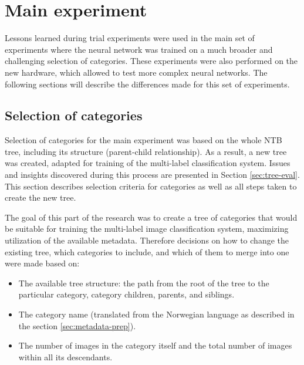 \section{Main experiment}
    Lessons learned during trial experiments were used in the main set of experiments where the neural network was trained on a much broader and challenging selection of categories. These experiments were also performed on the new hardware, which allowed to test more complex neural networks. The following sections will describe the differences made for this set of experiments.
    
    \subsection{Selection of categories}
    \label{sec:main-cat-selection}
    Selection of categories for the main experiment was based on the whole NTB tree, including its structure (parent-child relationship). As a result, a new tree was created, adapted for training of the multi-label classification system. Issues and insights discovered during this process are presented in Section \ref{sec:tree-eval}. This section describes selection criteria for categories as well as all steps taken to create the new tree.
    
    The goal of this part of the research was to create a tree of categories that would be suitable for training the multi-label image classification system, maximizing utilization of the available metadata. Therefore decisions on how to change the existing tree, which categories to include, and which of them to merge into one were made based on:
    
    \begin{itemize}
        \item The available tree structure: the path from the root of the tree to the particular category, category children, parents, and siblings.
        \item The category name (translated from the Norwegian language as described in the section \ref{sec:metadata-prep}).
        \item The number of images in the category itself and the total number of images within all its descendants.
    \end{itemize}
    
